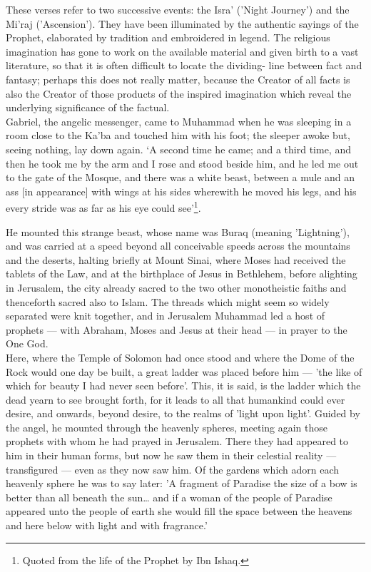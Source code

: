 \documentclass[10pt, twoside]{book}
\begin{document}
These verses refer to two successive events: the Isra' ('Night Journey') and the Mi'raj 
('Ascension'). They have been illuminated by the authentic sayings of the Prophet, elaborated by 
tradition and embroidered in legend. The religious imagination has gone to work on the available 
material and given birth to a vast literature, so that it is often difficult to locate the dividing\hyp{}
line between fact and fantasy; perhaps this does not really matter, because the Creator of all facts 
is also the Creator of those products of the inspired imagination which reveal the underlying 
significance of the factual. \\

Gabriel, the angelic messenger, came to Muhammad when he was sleeping in a room close to the Ka'ba 
and touched him with his foot; the sleeper awoke but, seeing nothing, lay down again. `A second time 
he came; and a third time, and then he took me by the arm and I rose and stood beside him, and he led 
me out to the gate of the Mosque, and there was a white beast, between a mule and an ass [in 
appearance] with wings at his sides wherewith he moved his legs, and his every stride was as far as 
his eye could see'\footnote{Quoted from the life of the Prophet by Ibn Ishaq.}.

He mounted this strange beast, whose name was Buraq (meaning 'Lightning'), and was carried at a speed 
beyond all conceivable speeds across the mountains and the deserts, halting briefly at Mount Sinai, 
where Moses had received the tablets of the Law, and at the birthplace of Jesus in Bethlehem, before 
alighting in Jerusalem, the city already sacred to the two other monotheistic faiths and thenceforth 
sacred also to Islam. The threads which might seem so widely separated were knit together, and in 
Jerusalem Muhammad led a host of prophets --- with Abraham, Moses and Jesus at their head --- in prayer to the One God. \\

Here, where the Temple of Solomon had once stood and where the Dome of the Rock would one day be 
built, a great ladder was placed before him --- 'the like of which for beauty I had never seen before'. 
This, it is said, is the ladder which the dead yearn to see brought forth, for it leads to all that 
humankind could ever desire, and onwards, beyond desire, to the realms of 'light upon light'. Guided 
by the angel, he mounted through the heavenly spheres, meeting again those prophets with whom he had 
prayed in Jerusalem. There they had appeared to him in their human forms, but now he saw them in 
their celestial reality --- transfigured --- even as they now saw him. Of the gardens which adorn each 
heavenly sphere he was to say later: 'A fragment of Paradise the size of a bow is better than all 
beneath the sun\ldots{} and if a woman of the people of Paradise appeared unto the people of earth she 
would fill the space between the heavens and here below with light and with fragrance.' \\
\end{document}
